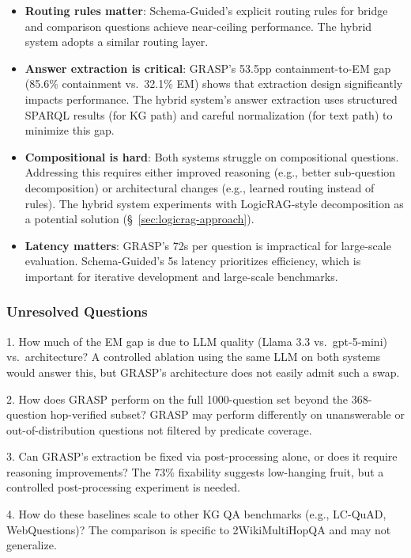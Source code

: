 \begin{itemize}
\item \textbf{Routing rules matter}: Schema-Guided's explicit routing rules for bridge and comparison questions achieve near-ceiling performance. The hybrid system adopts a similar routing layer.

\item \textbf{Answer extraction is critical}: GRASP's 53.5pp containment-to-EM gap (85.6\% containment vs.\ 32.1\% EM) shows that extraction design significantly impacts performance. The hybrid system's answer extraction uses structured SPARQL results (for KG path) and careful normalization (for text path) to minimize this gap.

\item \textbf{Compositional is hard}: Both systems struggle on compositional questions. Addressing this requires either improved reasoning (e.g., better sub-question decomposition) or architectural changes (e.g., learned routing instead of rules). The hybrid system experiments with LogicRAG-style decomposition as a potential solution (\S~\ref{sec:logicrag-approach}).

\item \textbf{Latency matters}: GRASP's 72s per question is impractical for large-scale evaluation. Schema-Guided's 5s latency prioritizes efficiency, which is important for iterative development and large-scale benchmarks.
\end{itemize}

\subsubsection{Unresolved Questions}

1. How much of the EM gap is due to LLM quality (Llama 3.3 vs.\ gpt-5-mini) vs.\ architecture? A controlled ablation using the same LLM on both systems would answer this, but GRASP's architecture does not easily admit such a swap.

2. How does GRASP perform on the full 1000-question set beyond the 368-question hop-verified subset? GRASP may perform differently on unanswerable or out-of-distribution questions not filtered by predicate coverage.

3. Can GRASP's extraction be fixed via post-processing alone, or does it require reasoning improvements? The 73\% fixability suggests low-hanging fruit, but a controlled post-processing experiment is needed.

4. How do these baselines scale to other KG QA benchmarks (e.g., LC-QuAD, WebQuestions)? The comparison is specific to 2WikiMultiHopQA and may not generalize.
